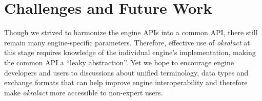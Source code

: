 \documentclass[conference]{IEEEtran}
\begin{document}



\section{Challenges and Future Work}



Though we strived to harmonize the engine APIs into a common API,
there still remain many engine-specific parameters. Therefore,
effective use of \textit{okralact} at this stage requires knowledge
of the individual engine's implementation, making the common API a
``leaky abstraction''. Yet we hope to encourage engine developers and
users to discussions about unified
terminology, data types and exchange formats that can help improve engine
interoperability and therefore make \textit{okralact} more
accessible to non-expert users.



\end{document}
